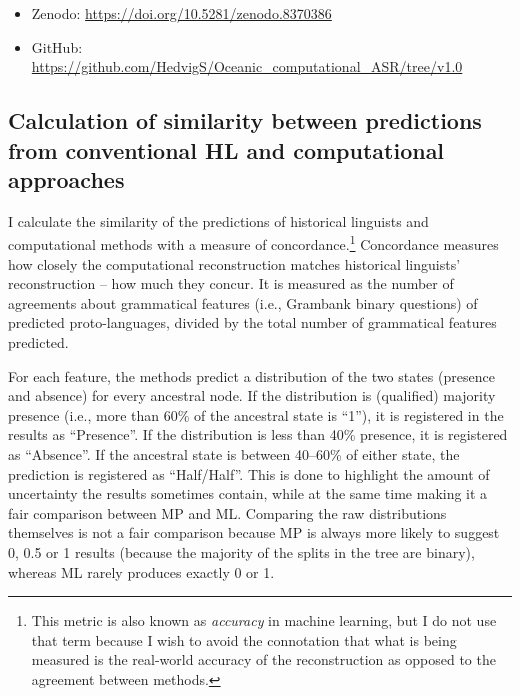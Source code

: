 \documentclass[12pt,letterpaper]{article}
\begin{document}
\begin{itemize}
    \item Zenodo: {\small\url{https://doi.org/10.5281/zenodo.8370386}}
    \item GitHub: {\small\url{https://github.com/HedvigS/Oceanic_computational_ASR/tree/v1.0}}
\end{itemize}


 \FloatBarrier
\subsection{Calculation of similarity between predictions from conventional HL and computational approaches}
\label{result_calc_section}
I calculate the similarity of the predictions of historical linguists and computational methods with a measure of concordance.\footnote{This metric is also known as \textit{accuracy} in machine learning, but I do not use that term because I wish to avoid the connotation that what is being measured is the real-world accuracy of the reconstruction as opposed to the agreement between methods.} Concordance measures how closely the computational reconstruction matches historical linguists' reconstruction -- how much they concur. It is measured as the number of agreements about grammatical features (i.e., Grambank binary questions) of predicted proto-languages, divided by the total number of grammatical features predicted. 


For each feature, the methods predict a distribution of the two states (presence and absence) for every ancestral node. If the distribution is (qualified) majority presence (i.e., more than 60\% of the ancestral state is ``1''), it is registered in the results as ``Presence''. If the distribution is less than 40\% presence, it is registered as ``Absence''. If the ancestral state is between 40--60\% of either state, the prediction is registered as ``Half/Half''. This is done to highlight the amount of uncertainty the results sometimes contain, while at the same time making it a fair comparison between MP and ML. Comparing the raw distributions themselves is not a fair comparison because MP is always more likely to suggest 0, 0.5 or 1 results (because the majority of the splits in the tree are binary), whereas ML rarely produces exactly 0 or 1. 
\end{document}
